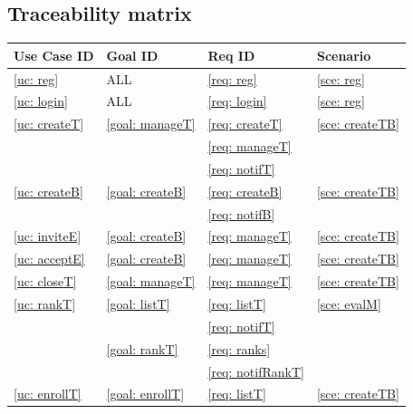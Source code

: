     \subsection{Traceability matrix}
    \begin{table}[h]
	    \centering
            \renewcommand{\arraystretch}{1.5}
            \begin{tabular}{|m{3cm}|m{3cm}|m{3cm}|m{3cm}|}
                \hline
                \textbf{Use Case ID} & \textbf{Goal ID} & \textbf{Req ID} & \textbf{Scenario} \\
                \hline
                \ref{uc: reg} & ALL & \ref{req: reg} & \ref{sce: reg}  \\
                \hline
                \ref{uc: login} & ALL & \ref{req: login} & \ref{sce: reg}   \\
                \hline
                \ref{uc: createT} & \ref{goal: manageT} & \ref{req: createT} & \ref{sce: createTB}   \\
                \null & \null  & \ref{req: manageT}&\null \\
                \null & \null  & \ref{req: notifT}&\null \\
                \hline
                \ref{uc: createB} & \ref{goal: createB} & \ref{req: createB} & \ref{sce: createTB}  \\
                \null & \null  & \ref{req: notifB}&\null \\
                \hline
                \ref{uc: inviteE} & \ref{goal: createB} & \ref{req: manageT} & \ref{sce: createTB}  \\
                \hline
                \ref{uc: acceptE} & \ref{goal: createB} & \ref{req: manageT} & \ref{sce: createTB}  \\
                \hline
                \ref{uc: closeT} & \ref{goal: manageT} & \ref{req: manageT} & \ref{sce: createTB}  \\
                \hline
                \ref{uc: rankT} & \ref{goal: listT} & \ref{req: listT} & \ref{sce: evalM}  \\
                \null & \null  & \ref{req: notifT}&\null \\
                \null & \ref{goal: rankT}  & \ref{req: ranks}&\null \\
                \null & \null  & \ref{req: notifRankT}&\null \\
                \hline
                \ref{uc: enrollT} & \ref{goal: enrollT} & \ref{req: listT} & \ref{sce: createTB}  \\

\end{tabular}
\end{table}
